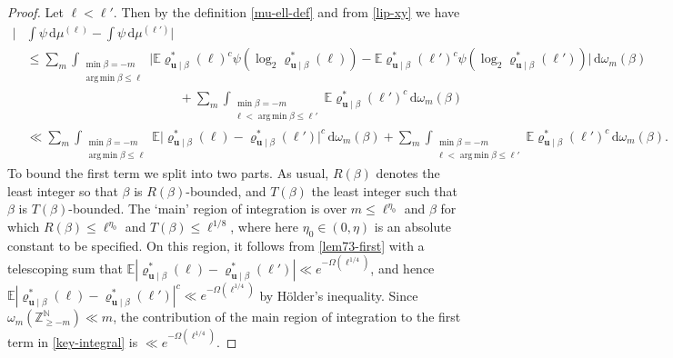 \documentclass[10pt,a4paper]{amsart}
\newcommand\N{\mathbb{N}}
\newcommand\Z{\mathbb{Z}}
\DeclareMathOperator*{\argmin}{arg\,min}
\renewcommand{\ge}{\geqslant}
\renewcommand{\le}{\leqslant}
\newcommand{\mb}{\mathbb}
\newcommand{\mbf}{\mathbf}
\begin{document}
\begin{proof}
Let $\ell < \ell'$. Then by the definition \cref{mu-ell-def} and from \cref{lip-xy} we have
\begin{align}\nonumber\big| & \int \psi \, \mathrm{d}\mu^{(\ell)} - \int \psi \, \mathrm{d}\mu^{(\ell')} \big| \\\nonumber & \le \sum_m \int_{\substack{\min \beta = -m \\ \argmin \beta \le \ell}}\Big|  \mb{E} \varrho^*_{\mbf{u} \mid \beta}(\ell)^c \psi (\log_2 \varrho^*_{\mbf{u} \mid \beta}(\ell)) -  \mb{E} \varrho^*_{\mbf{u} \mid \beta}(\ell')^c \psi (\log_2 \varrho^*_{\mbf{u} \mid \beta}(\ell')) \Big| \, \mathrm{d}\omega_m(\beta) \\ \nonumber & \qquad\qquad\qquad\qquad\qquad\qquad + \sum_{m}\int_{\substack{\min \beta = -m \\ \ell < \argmin \beta \le \ell'}} \mb{E}\varrho^*_{\mbf{u} \mid \beta}(\ell')^c \, \mathrm{d}\omega_m(\beta)\\  
& \ll \sum_m \int_{\substack{\min \beta = -m \\ \argmin \beta \le \ell}}  \mb{E} \big|\varrho^*_{\mbf{u} \mid \beta}(\ell) -  \varrho^*_{\mbf{u} \mid \beta}(\ell')\big|^c \, \mathrm{d}\omega_m(\beta) + \sum_{m}\int_{\substack{\min \beta = -m \\ \ell < \argmin \beta \le \ell'}} \mb{E}\varrho^*_{\mbf{u} \mid \beta}(\ell')^c \, \mathrm{d}\omega_m(\beta).\label{key-integral}
\end{align}
To bound the first term we split into two parts. As usual, $R(\beta)$ denotes the least integer so that $\beta$ is $R(\beta)$-bounded, and $T(\beta)$ the least integer such that $\beta$ is $T(\beta)$-bounded. The `main' region of integration is over $m \le \ell^{\eta_0}$ and $\beta$ for which $R(\beta) \le \ell^{\eta_0}$ and $T(\beta) \le \ell^{1/8}$, where here $\eta_0\in (0,\eta)$ is an absolute constant to be specified. On this region, it follows from \cref{lem73-first} with a telescoping sum that $\mb{E} |\varrho^*_{\mbf{u} \mid \beta}(\ell) - \varrho^*_{\mbf{u} \mid \beta}(\ell')| \ll e^{-\Omega(\ell^{1/4})}$, and hence $\mb{E} |\varrho^*_{\mbf{u} \mid \beta}(\ell) - \varrho^*_{\mbf{u} \mid \beta}(\ell')|^c \ll e^{-\Omega(\ell^{1/4})}$ by H\"older's inequality. Since $\omega_m (\Z^{\N}_{\ge -m}) \ll m$, the contribution of the main region of integration to the first term in \cref{key-integral} is $\ll e^{-\Omega(\ell^{1/4})}$.


\end{proof}
\end{document}
